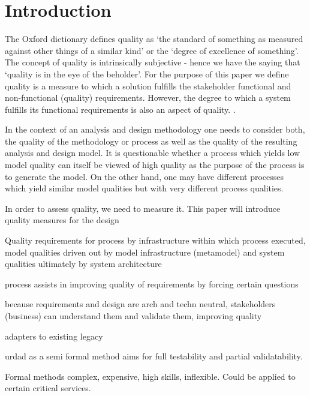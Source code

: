 \section{Introduction}\label{sec:Introduction}

The Oxford dictionary defines quality as `the standard of something as measured against other things of a similar kind' or the `degree of excellence of something'. The concept of quality is intrinsically subjective - hence we have the saying that `quality is in the eye of the beholder'. For the purpose of this paper we define quality is a measure to which a solution fulfills the stakeholder functional and non-functional (quality) requirements\cite{}. However, the degree to which a system fulfills its functional requirements is also an aspect of quality.  \cite{lange_managing_2005,lange_improving_2006}.


In the context of an analysis and design methodology one needs to consider both, the quality of the methodology or process as well as the quality of the resulting analysis and design model. It is questionable whether a process which yields low model quality can itself be viewed of high quality as the purpose of the process is to generate the model. On the other hand, one may have different processes which yield similar model qualities but with very different process qualities. 

In order to assess quality, we need to measure it. This paper will introduce quality measures for the design



Quality requirements for process  by infrastructure within which process executed, model qualities driven out by model infrastructure (metamodel) and system qualities ultimately by system architecture

process assists in improving quality of requirements by forcing certain questions

because requirements and design are arch and techn neutral, stakeholders (business) can understand them and validate them, improving quality

adapters to existing legacy

urdad as a semi formal method aims for full testability and partial validatability.

Formal methods complex, expensive, high skills, inflexible. Could be applied to certain critical services.